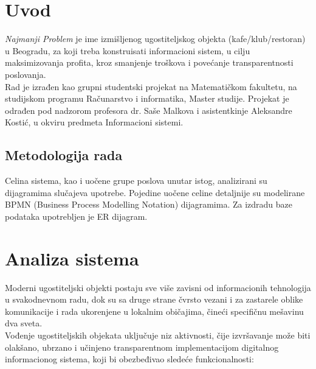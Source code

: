 \documentclass{article}
\begin{document}
\tableofcontents
\newpage


\section{Uvod}
\emph{Najmanji Problem} je ime izmišljenog ugostiteljskog objekta (kafe/klub/restoran) u Beogradu, za koji treba konstruisati informacioni sistem, u cilju maksimizovanja profita, kroz smanjenje troškova i povećanje transparentnosti
poslovanja.\\

Rad je izrađen kao grupni studentski projekat na Matematičkom fakultetu, na studijskom programu Računarstvo i informatika,  Master studije. Projekat je odrađen pod nadzorom profesora dr. Saše Malkova i asistentkinje Aleksandre Kostić, u okviru predmeta Informacioni sistemi.\\


\subsection{Metodologija rada}

Celina sistema, kao i uočene grupe poslova unutar istog, analizirani su dijagramima slučajeva upotrebe. Pojedine uočene celine detaljnije su modelirane BPMN (Business Process Modelling Notation) dijagramima. Za izdradu baze podataka upotrebljen je ER dijagram.


\section{Analiza sistema}

Moderni ugostiteljski objekti postaju sve više zavisni od informacionih tehnologija u svakodnevnom radu, dok su sa druge strane čvrsto vezani i za zastarele oblike komunikacije i rada ukorenjene u lokalnim običajima, čineći specifičnu
mešavinu dva sveta.\\

Vođenje ugostiteljskih objekata uključuje niz aktivnosti, čije izvršavanje može biti olakšano, ubrzano i učinjeno transparentnom implementacijom digitalnog informacionog sistema, koji bi obezbeđivao sledeće funkcionalnosti:\\
\end{document}

